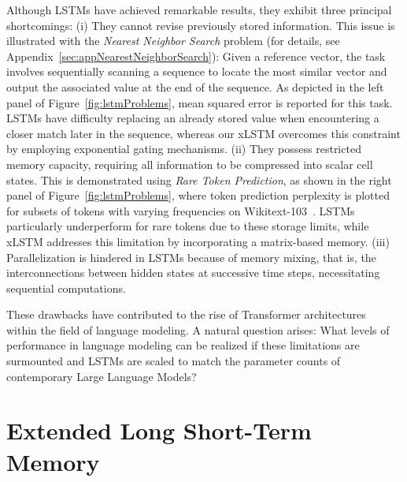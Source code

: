 Although LSTMs have achieved remarkable results, they exhibit three principal shortcomings: (i) They cannot revise previously stored information. This issue is illustrated with the {\it Nearest Neighbor Search} problem (for details, see Appendix~\ref{sec:appNearestNeighborSearch}): Given a reference vector, the task involves sequentially scanning a sequence to locate the most similar vector and output the associated value at the end of the sequence. As depicted in the left panel of Figure~\ref{fig:lstmProblems}, mean squared error is reported for this task. LSTMs have difficulty replacing an already stored value when encountering a closer match later in the sequence, whereas our xLSTM overcomes this constraint by employing exponential gating mechanisms. (ii) They possess restricted memory capacity, requiring all information to be compressed into scalar cell states. This is demonstrated using {\it Rare Token Prediction}, as shown in the right panel of Figure~\ref{fig:lstmProblems}, where token prediction perplexity is plotted for subsets of tokens with varying frequencies on Wikitext-103~\citep{Merity:17}. LSTMs particularly underperform for rare tokens due to these storage limits, while xLSTM addresses this limitation by incorporating a matrix-based memory. (iii) Parallelization is hindered in LSTMs because of memory mixing, that is, the interconnections between hidden states at successive time steps, necessitating sequential computations.

These drawbacks have contributed to the rise of Transformer architectures~\citep{Vaswani:17} within the field of language modeling. A natural question arises: What levels of performance in language modeling can be realized if these limitations are surmounted and LSTMs are scaled to match the parameter counts of contemporary Large Language Models?

\section{Extended Long Short-Term Memory}
\label{sec:xLSTM}

